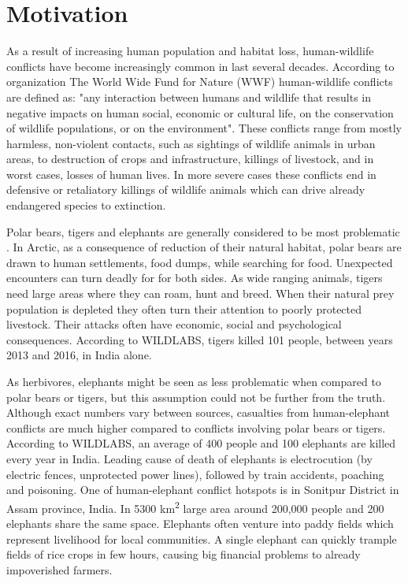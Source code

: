 \section{ Motivation}

As a result of increasing human population and habitat loss, human-wildlife conflicts have become increasingly common in last several decades\cite{philip-wildlife}.
According to organization The World Wide Fund for Nature (WWF) human-wildlife conflicts are defined as: "any interaction between humans and wildlife that results in negative impacts on human social, economic or cultural life, on the conservation of wildlife populations, or on the environment"\cite{conflict-manual}.
These conflicts range from mostly harmless, non-violent contacts, such as sightings of wildlife animals in urban areas, to destruction of crops and infrastructure, killings of livestock, and in worst cases, losses of human lives.
In more severe cases these conflicts end in defensive or retaliatory killings of wildlife animals which can drive already endangered species to extinction.

Polar bears, tigers and elephants are generally considered to be most problematic \cite{philip-wildlife}.
In Arctic, as a consequence of reduction of their natural habitat, polar bears are drawn to human settlements, food dumps, while searching for food\cite{wildlabs-polarbears}.
Unexpected encounters can turn deadly for for both sides.
As wide ranging animals, tigers need large areas where they can roam, hunt and breed\cite{wildlabs-tigers}.
When their natural prey population is depleted they often turn their attention to poorly protected livestock. 
Their attacks often have economic, social and psychological consequences.
According to WILDLABS, tigers killed 101 people, between years 2013 and 2016, in India alone\cite{wildlabs-tigers}.

As herbivores, elephants might be seen as less problematic when compared to polar bears or tigers, but this assumption could not be further from the truth.
Although exact numbers vary between sources, casualties from human-elephant conflicts are much higher compared to conflicts involving polar bears or tigers.
According to WILDLABS, an average of 400 people and 100 elephants are killed every year in India\cite{wildlabs-elephants}. 
Leading cause of death of elephants is electrocution (by electric fences, unprotected power lines), followed by train accidents, poaching and poisoning\cite{cause-of-death}.
One of human-elephant conflict hotspots is in Sonitpur District in Assam province, India. 
In 5300 km\textsuperscript{2} large area around 200,000 people and 200 elephants share the same space\cite{wildlabs-elephants}.
Elephants often venture into paddy fields which represent livelihood for local communities.
A single elephant can quickly trample fields of rice crops in few hours, causing big financial problems to already impoverished farmers\cite{wildlabs-elephants}.

